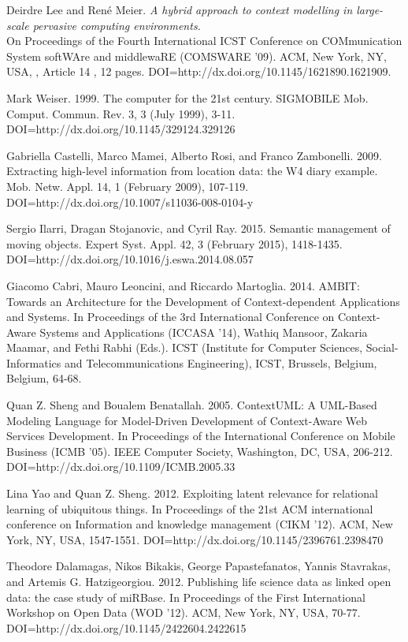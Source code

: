 \documentclass[]{report}
\begin{document}
\begin{thebibliography}{99}


Deirdre Lee and René Meier. 
\textit{ A hybrid approach to context modelling in large-scale pervasive computing environments.}\\ 
On Proceedings of the Fourth International ICST Conference on COMmunication System softWAre and middlewaRE (COMSWARE '09). ACM, New York, NY, USA, , Article 14 , 12 pages. DOI=http://dx.doi.org/10.1145/1621890.1621909.

Mark Weiser. 1999. The computer for the 21st century. SIGMOBILE Mob. Comput. Commun. Rev. 3, 3 (July 1999), 3-11. DOI=http://dx.doi.org/10.1145/329124.329126

Gabriella Castelli, Marco Mamei, Alberto Rosi, and Franco Zambonelli. 2009. Extracting high-level information from location data: the W4 diary example. Mob. Netw. Appl. 14, 1 (February 2009), 107-119. DOI=http://dx.doi.org/10.1007/s11036-008-0104-y

Sergio Ilarri, Dragan Stojanovic, and Cyril Ray. 2015. Semantic management of moving objects. Expert Syst. Appl. 42, 3 (February 2015), 1418-1435. DOI=http://dx.doi.org/10.1016/j.eswa.2014.08.057
 
 
Giacomo Cabri, Mauro Leoncini, and Riccardo Martoglia. 2014. AMBIT: Towards an Architecture for the Development of Context-dependent Applications and Systems. In Proceedings of the 3rd International Conference on Context-Aware Systems and Applications (ICCASA '14), Wathiq Mansoor, Zakaria Maamar, and Fethi Rabhi (Eds.). ICST (Institute for Computer Sciences, Social-Informatics and Telecommunications Engineering), ICST, Brussels, Belgium, Belgium, 64-68.

Quan Z. Sheng and Boualem Benatallah. 2005. ContextUML: A UML-Based Modeling Language for Model-Driven Development of Context-Aware Web Services Development. In Proceedings of the International Conference on Mobile Business (ICMB '05). IEEE Computer Society, Washington, DC, USA, 206-212. DOI=http://dx.doi.org/10.1109/ICMB.2005.33

Lina Yao and Quan Z. Sheng. 2012. Exploiting latent relevance for relational learning of ubiquitous things. In Proceedings of the 21st ACM international conference on Information and knowledge management (CIKM '12). ACM, New York, NY, USA, 1547-1551. DOI=http://dx.doi.org/10.1145/2396761.2398470

Theodore Dalamagas, Nikos Bikakis, George Papastefanatos, Yannis Stavrakas, and Artemis G. Hatzigeorgiou. 2012. Publishing life science data as linked open data: the case study of miRBase. In Proceedings of the First International Workshop on Open Data (WOD '12). ACM, New York, NY, USA, 70-77. DOI=http://dx.doi.org/10.1145/2422604.2422615



\end{thebibliography}
\end{document}
